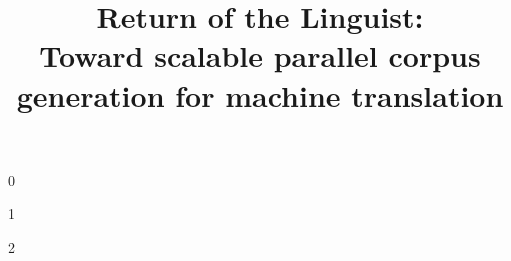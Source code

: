 
\def\buildemnlp{0}
\def\buildamta{1}
\def\buildhcomp{2}
\def\buildtarget{\buildamta} %

\title{Return of the Linguist:\\Toward scalable parallel corpus generation for machine translation}

\if \buildtarget \buildemnlp    
    
    \newcommand\mycitep[1]{\cite{#1}}     %
    \newcommand\mynewcite[1]{\newcite{#1}}
    \newcommand\amtaonly[1]{} %
    \newcommand\emnlponly[1]{#1}
    \newcommand\hcomponly[1]{}
\fi
\if \buildtarget \buildamta    
    
    \newcommand\mycitep[1]{\citep{#1}} 
    \newcommand\mynewcite[1]{\cite{#1}}  
    \newcommand\amtaonly[1]{#1}
    \newcommand\emnlponly[1]{}
    \newcommand\hcomponly[1]{}
    
    \usepackage{amstext}
    \usepackage{multirow}
    
    \usepackage{graphicx}
    
    \usepackage{tabularx}

\fi
\if \buildtarget \buildhcomp    
    
    \newcommand\mycitep[1]{\cite{#1}} 
    \newcommand\mynewcite[1]{\citeauthor{#1}~\shortcite{#1}}  
    \newcommand\amtaonly[1]{}
    \newcommand\emnlponly[1]{}
    \newcommand\hcomponly[1]{#1}
\fi
    
\usepackage{CJK}
\usepackage[utf8]{inputenc}
\newcommand\zh[1]{\begin{CJK}{UTF8}{gbsn}#1\end{CJK}}





